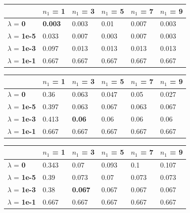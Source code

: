 \documentclass[10pt]{article}
\begin{document}
\begin{table}
\centering
\begin{tabular}{llllll}
\toprule
& $n_1$ = \bf{1} & $n_1$ =  \bf{3} & $n_1$ =  \bf{5} & $n_1$ =  \bf{7} & $n_1$ =  \bf{9} \\
\midrule
$\lambda$ = \bf{0} &        \bf{0.003} & 0.003 & 0.01  & 0.007 & 0.003 \\
$\lambda$ = \bf{1e-5} &    0.033 & 0.007 & 0.003 & 0.007 & 0.003 \\
$\lambda$ = \bf{1e-3} &    0.097 & 0.013 & 0.013 & 0.013 & 0.013 \\
$\lambda$ = \bf{1e-1} &    0.667 & 0.667 & 0.667 & 0.667 & 0.667 \\
\bottomrule
\end{tabular}
\end{table}


\begin{table}
\centering
\begin{tabular}{llllll}
\toprule
& $n_1$ = \bf{1} & $n_1$ =  \bf{3} & $n_1$ =  \bf{5} & $n_1$ =  \bf{7} & $n_1$ =  \bf{9} \\
\midrule
$\lambda$ = \bf{0} &  0.36  & 0.063 & 0.047 & 0.05  & 0.027 \\
$\lambda$ = \bf{1e-5} & 0.397 & 0.063 & 0.067 & 0.063 & 0.067 \\
$\lambda$ = \bf{1e-3} & 0.413 & \bf{0.06}  & 0.06  & 0.06  & 0.06  \\
$\lambda$ = \bf{1e-1} & 0.667 & 0.667 & 0.667 & 0.667 & 0.667 \\
\bottomrule
\end{tabular}
\end{table}

\begin{table}
\centering
\begin{tabular}{llllll}
\toprule
& $n_1$ = \bf{1} & $n_1$ =  \bf{3} & $n_1$ =  \bf{5} & $n_1$ =  \bf{7} & $n_1$ =  \bf{9} \\
\midrule
$\lambda$ = \bf{0} &      0.343 & 0.07  & 0.093 & 0.1   & 0.107 \\
$\lambda$ = \bf{1e-5} &   0.39  & 0.073 & 0.07  & 0.073 & 0.073 \\
$\lambda$ = \bf{1e-3} &  0.38  & \bf{0.067} & 0.067 & 0.067 & 0.067 \\
$\lambda$ = \bf{1e-1} &  0.667 & 0.667 & 0.667 & 0.667 & 0.667 \\
\bottomrule
\end{tabular}
\end{table}
\end{document}
